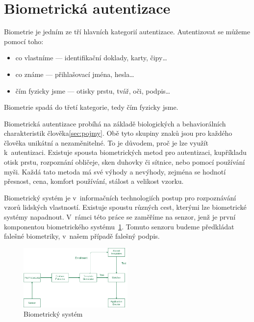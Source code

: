\section{Biometrická autentizace}
Biometrie je jedním ze tří hlavních kategorií autentizace.
Autentizovat se můžeme pomocí toho:

\begin{itemize}
  \item co vlastníme --- identifikační doklady, karty, čipy\ldots   %
  \item co známe --- přihlašovací jména, hesla\ldots                %
  \item čím fyzicky jsme --- otisky prstu, tvář, oči, podpis\ldots~\cite{RakRoman2008}%
\end{itemize}                                                   %
Biometrie spadá do třetí kategorie, tedy čím fyzicky jsme. 
\newline

Biometrická autentizace probíhá na základě biologických a behaviorálních charakteristik člověka\ref{sec:pojmy}. 
Obě tyto skupiny znaků jsou pro každého člověka unikátní a nezaměnitelné. To je důvodem, proč je lze využít k~autentizaci.
Existuje spousta biometrických metod pro autentizaci, kupříkladu otisk prstu, rozpoznání obličeje, sken duhovky či sítnice, nebo pomocí používání myši. 
Každá tato metoda má své výhody a nevýhody, zejména se hodnotí přesnost, cena, komfort používání, stálost a velikost vzorku. %

Biometrický systém je v~informačních technologiích postup pro rozpoznávání vzorů lidských vlastností.       %
Existuje spoustu různých cest, kterými lze biometrické systémy napadnout.                                   %
V~rámci této práce se zaměříme na senzor, jenž je první komponentou biometrického systému~\ref{fig:biometricky_system}.%
Tomuto senzoru budeme předkládat falešné biometriky, v~našem případě falešný podpis.~\cite{DrahanskýMartin2011}%

\begin{figure}[h]
  \centering
  \includegraphics[width=0.5\textwidth]{obrazky-figures/biometricky_system.png}
  \caption{Biometrický systém~\cite{geeksforGeeks2022}}  %
  \label{fig:biometricky_system}
\end{figure}

